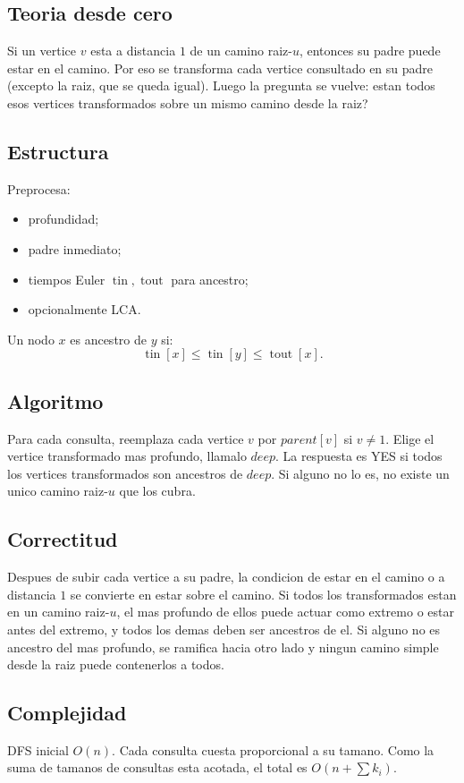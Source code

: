 \documentclass[10pt]{article}
\newcommand{\bigO}{O}
\newcommand{\tin}{\operatorname{tin}}
\newcommand{\tout}{\operatorname{tout}}
\begin{document}
\subsection*{Teoria desde cero}
Si un vertice $v$ esta a distancia $1$ de un camino raiz-$u$, entonces su padre
puede estar en el camino. Por eso se transforma cada vertice consultado en su
padre (excepto la raiz, que se queda igual). Luego la pregunta se vuelve: estan
todos esos vertices transformados sobre un mismo camino desde la raiz?

\subsection*{Estructura}
Preprocesa:
\begin{itemize}[leftmargin=*]
\item profundidad;
\item padre inmediato;
\item tiempos Euler $\tin,\tout$ para ancestro;
\item opcionalmente LCA.
\end{itemize}
Un nodo $x$ es ancestro de $y$ si:
\[
\tin[x]\le \tin[y]\le \tout[x].
\]

\subsection*{Algoritmo}
Para cada consulta, reemplaza cada vertice $v$ por $parent[v]$ si $v\ne 1$.
Elige el vertice transformado mas profundo, llamalo $deep$. La respuesta es
YES si todos los vertices transformados son ancestros de $deep$. Si alguno no
lo es, no existe un unico camino raiz-$u$ que los cubra.

\subsection*{Correctitud}
Despues de subir cada vertice a su padre, la condicion de estar en el camino o a
distancia $1$ se convierte en estar sobre el camino. Si todos los transformados
estan en un camino raiz-$u$, el mas profundo de ellos puede actuar como extremo
o estar antes del extremo, y todos los demas deben ser ancestros de el. Si alguno
no es ancestro del mas profundo, se ramifica hacia otro lado y ningun camino
simple desde la raiz puede contenerlos a todos.

\subsection*{Complejidad}
DFS inicial $\bigO(n)$. Cada consulta cuesta proporcional a su tamano. Como la
suma de tamanos de consultas esta acotada, el total es $\bigO(n+\sum k_i)$.
\end{document}
